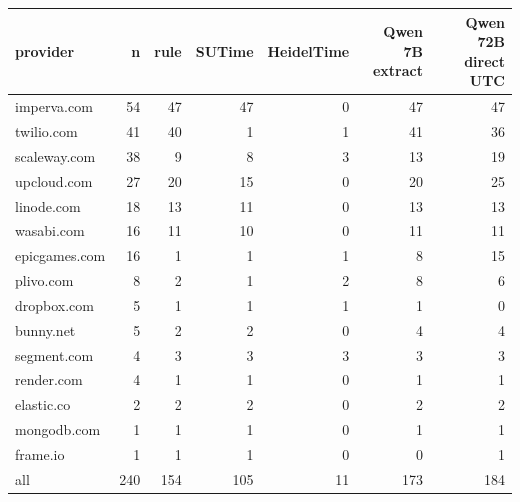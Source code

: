 \begin{tabular}{l r rrrrr}
\toprule
provider & n & rule & SUTime & HeidelTime & \shortstack{Qwen 7B\\extract} & \shortstack{Qwen 72B\\direct UTC} \\
\midrule
imperva.com & 54 & 47 & 47 & 0 & 47 & 47 \\
twilio.com & 41 & 40 & 1 & 1 & 41 & 36 \\
scaleway.com & 38 & 9 & 8 & 3 & 13 & 19 \\
upcloud.com & 27 & 20 & 15 & 0 & 20 & 25 \\
linode.com & 18 & 13 & 11 & 0 & 13 & 13 \\
wasabi.com & 16 & 11 & 10 & 0 & 11 & 11 \\
epicgames.com & 16 & 1 & 1 & 1 & 8 & 15 \\
plivo.com & 8 & 2 & 1 & 2 & 8 & 6 \\
dropbox.com & 5 & 1 & 1 & 1 & 1 & 0 \\
bunny.net & 5 & 2 & 2 & 0 & 4 & 4 \\
segment.com & 4 & 3 & 3 & 3 & 3 & 3 \\
render.com & 4 & 1 & 1 & 0 & 1 & 1 \\
elastic.co & 2 & 2 & 2 & 0 & 2 & 2 \\
mongodb.com & 1 & 1 & 1 & 0 & 1 & 1 \\
frame.io & 1 & 1 & 1 & 0 & 0 & 1 \\
\midrule
all & 240 & 154 & 105 & 11 & 173 & 184 \\
\bottomrule
\end{tabular}

